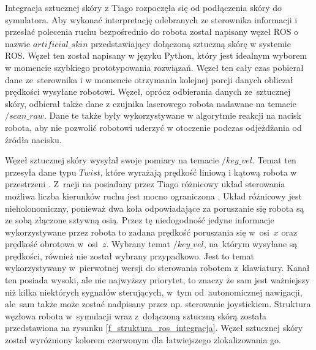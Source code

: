 Integracja sztucznej skóry z Tiago rozpoczęła się od podłączenia skóry do symulatora. Aby wykonać interpretację odebranych ze sterownika informacji i przesłać polecenia ruchu bezpośrednio do robota został napisany węzeł ROS o nazwie $artificial\_skin$ przedstawiający dołączoną sztuczną skórę w systemie ROS. Węzeł ten został napisany w języku Python, który jest idealnym wyborem w momencie szybkiego prototypowania rozwiązań. Węzeł ten cały czas pobierał dane ze~sterownika i w momencie otrzymania kolejnej porcji danych obliczał prędkości wysyłane robotowi. Węzeł, oprócz odbierania danych ze~sztucznej skóry, odbierał także dane z czujnika laserowego robota nadawane na temacie $/scan\_raw$. Dane te także były wykorzystywane w algorytmie reakcji na nacisk robota, aby nie pozwolić robotowi uderzyć w otoczenie podczas odjeżdżania od źródła nacisku.

Węzeł sztucznej skóry wysyłał swoje pomiary na temacie $/key\_vel$. Temat ten przesyła dane typu $Twist$, które wyrażają prędkość liniową i kątową robota w przestrzeni \cite{b_site_ROS_twist}. Z~racji na posiadany przez Tiago różnicowy układ sterowania możliwa liczba kierunków ruchu jest mocno ograniczona \cite{b_site_tiago}. Układ różnicowy jest nieholonomiczny, ponieważ dwa koła odpowiadające za poruszanie się robota są ze sobą złączone sztywną osią. Przez tę niedogodność jedyne informacje wykorzystywane przez robota to zadana prędkość poruszania się w~osi~$x$ oraz prędkość obrotowa w~osi~$z$. Wybrany temat $/key\_vel$, na~którym wysyłane są prędkości, również nie został wybrany przypadkowo. Jest to temat wykorzystywany w~pierwotnej wersji do sterowania robotem z~klawiatury. Kanał ten posiada wysoki, ale nie najwyższy priorytet, to znaczy że sam jest ważniejszy niż kilka niektórych sygnałów sterujących, w~tym od~autonomicznej nawigacji, ale~sam także może zostać nadpisany przez np. sterowanie joystickiem. Struktura węzłowa robota w~symulacji wraz z~dołączoną sztuczną skórą została przedstawiona na rysunku \ref{f_struktura_ros_integracja}. Węzeł sztucznej skóry został wyróżniony kolorem czerwonym dla łatwiejszego zlokalizowania go.

